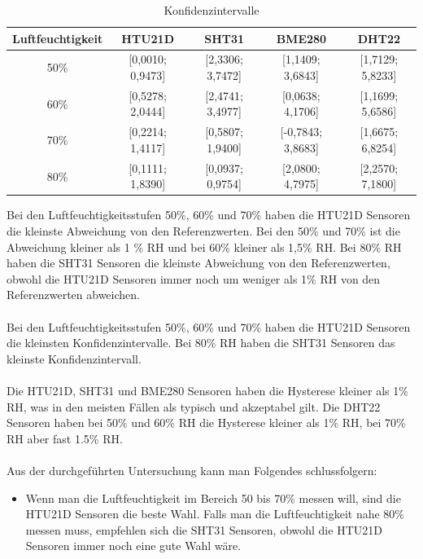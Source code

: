 \documentclass[runningheads]{llncs}
\begin{document}
\begin{table}[h]
\centering
\caption{Konfidenzintervalle}
\begin{tabular}{|c|c|c|c|c|}
\hline
Luftfeuchtigkeit & HTU21D              & SHT31                & BME280                & DHT22                \\ \hline
50\%          & {[}0,0010; 0,9473{]} & {[}2,3306; 3,7472{]} & {[}1,1409; 3,6843{]}  & {[}1,7129; 5,8233{]} \\ \hline
60\%          & {[}0,5278; 2,0444{]} & {[}2,4741; 3,4977{]} & {[}0,0638; 4,1706{]}  & {[}1,1699; 5,6586{]} \\ \hline
70\%          & {[}0,2214; 1,4117{]} & {[}0,5807; 1,9400{]} & {[}-0,7843; 3,8683{]} & {[}1,6675; 6,8254{]} \\ \hline
80\%          & {[}0,1111; 1,8390{]} & {[}0,0937; 0,9754{]} & {[}2,0800; 4,7975{]}  & {[}2,2570; 7,1800{]} \\ \hline
\end{tabular}
\end{table}
Bei den Luftfeuchtigkeitsstufen 50\%, 60\% und 70\% haben die HTU21D Sensoren die kleinste Abweichung von den Referenzwerten. Bei den 50\% und 70\% ist die Abweichung kleiner als 1 \% RH und bei 60\% kleiner als 1,5\% RH. Bei 80\% RH haben die SHT31 Sensoren die kleinste Abweichung von den Referenzwerten, obwohl die HTU21D Sensoren immer noch um weniger als 1\% RH von den Referenzwerten abweichen.\\ 
\\Bei den Luftfeuchtigkeitsstufen 50\%, 60\% und 70\% haben die HTU21D Sensoren die kleinsten Konfidenzintervalle. Bei 80\% RH haben die SHT31 Sensoren das kleinste Konfidenzintervall.\\
\\Die HTU21D, SHT31 und BME280 Sensoren haben die Hysterese kleiner als 1\% RH, was in den meisten Fällen als typisch und akzeptabel gilt. Die DHT22 Sensoren haben bei 50\% und 60\% RH die Hysterese kleiner als 1\% RH, bei 70\% RH aber fast 1.5\% RH.\\
\\Aus der durchgeführten Untersuchung kann man Folgendes schlussfolgern:
\begin{itemize}
\item Wenn man die Luftfeuchtigkeit im Bereich 50 bis 70\% messen will, sind die HTU21D Sensoren die beste Wahl. Falls man die Luftfeuchtigkeit nahe 80\% messen muss, empfehlen sich die SHT31 Sensoren, obwohl die HTU21D Sensoren immer noch eine gute Wahl wäre.
\end{itemize}
\end{document}
